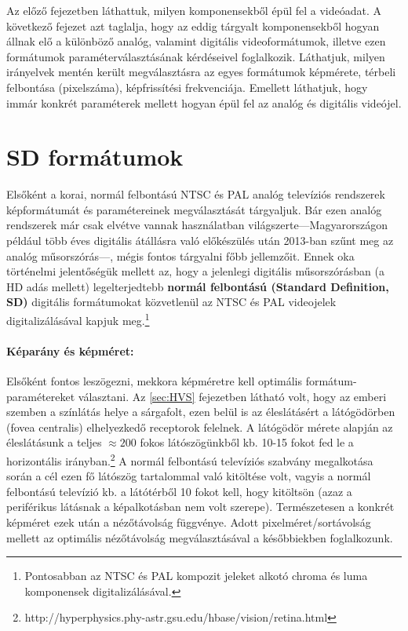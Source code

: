 Az előző fejezetben láthattuk, milyen komponensekből épül fel a videóadat.
A következő fejezet azt taglalja, hogy az eddig tárgyalt komponensekből hogyan állnak elő a különböző analóg, valamint digitális videoformátumok, illetve ezen formátumok paraméterválasztásának kérdéseivel foglalkozik.
Láthatjuk, milyen irányelvek mentén került megválasztásra az egyes formátumok képmérete, térbeli felbontása (pixelszáma), képfrissítési frekvenciája. 
Emellett láthatjuk, hogy immár konkrét paraméterek mellett hogyan épül fel az analóg és digitális videójel.

\section{SD formátumok}

Elsőként a korai, normál felbontású NTSC és PAL analóg televíziós rendszerek képformátumát és paramétereinek megválasztását tárgyaljuk.
Bár ezen analóg rendszerek már csak elvétve vannak használatban világszerte---Magyarországon például több éves digitális átállásra való előkészülés után 2013-ban szűnt meg az analóg műsorszórás---, mégis fontos tárgyalni főbb jellemzőit.
Ennek oka történelmi jelentőségük mellett az, hogy a jelenlegi digitális műsorszórásban (a HD adás mellett) legelterjedtebb \textbf{normál felbontású (Standard Definition, SD)} digitális formátumokat közvetlenül az NTSC és PAL videojelek digitalizálásával kapjuk meg.\footnote{Pontosabban az NTSC és PAL kompozit jeleket alkotó chroma és luma komponensek digitalizálásával.}

\paragraph{Képarány és képméret:\\}
Elsőként fontos leszögezni, mekkora képméretre kell optimális formátum-paramétereket választani.
Az \ref{sec:HVS} fejezetben látható volt, hogy az emberi szemben a színlátás helye a sárgafolt, ezen belül is az éleslátásért a látógödörben (fovea centralis) elhelyezkedő receptorok felelnek.
A látógödör mérete alapján az éleslátásunk a teljes $\approx200$ fokos látószögünkből kb. 10-15 fokot fed le a horizontális irányban.\footnote{http://hyperphysics.phy-astr.gsu.edu/hbase/vision/retina.html}
A normál felbontású televíziós szabvány megalkotása során a cél ezen fő látószög tartalommal való kitöltése volt, vagyis a normál felbontású televízió kb. a látótérből 10 fokot kell, hogy kitöltsön (azaz a periférikus látásnak a képalkotásban nem volt szerepe).
Természetesen a konkrét képméret ezek után a nézőtávolság függvénye.
Adott pixelméret/sortávolság mellett az optimális nézőtávolság megválasztásával a későbbiekben foglalkozunk.

